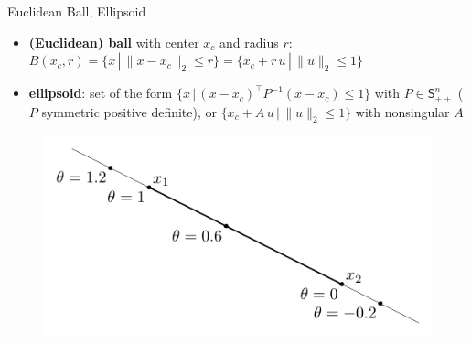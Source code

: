 \documentclass[10pt]{beamer}
\newcommand{\ds}{\displaystyle}
\theoremstyle{definition}
\begin{document}
\begin{frame}{Euclidean Ball, Ellipsoid}
  \begin{itemize}
    \item {\bf (Euclidean) ball} with center $x_c$ and radius $r$: \\ $\ds B(x_c, r) = \{x\,|\,\|x - x_c\|_2\leqslant r\} = \{x_c + r\,u\,|\,\|u\|_2 \leqslant 1\}$
    \item {\bf ellipsoid}: set of the form $\ds\{x\,|\,(x - x_c)^\top P^{-1}(x - x_c)\leqslant 1\}$ with $P\in\mathsf{S}_{++}^n$ ($P$ symmetric positive definite), or $\ds\{x_c + A\,u\,|\,\|u\|_2 \leqslant 1\}$ with nonsingular $A$
  \end{itemize}
  \begin{figure}[!htbp]
    \centering
    \includegraphics[scale=0.9,page=9]{fig/note06/02.pdf}
  \end{figure}
\end{frame}
\end{document}
